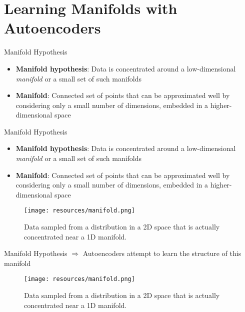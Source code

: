 \documentclass[handout]{beamer}
\begin{document}
\section{Learning Manifolds with Autoencoders}
\begin{frame}[t]{Manifold Hypothesis}
    \begin{itemize}
        \item \textbf{Manifold hypothesis}: Data is concentrated around a low-dimensional \textit{manifold} or a small set of such manifolds
            \pause
        \item \textbf{Manifold}: Connected set of points that can be approximated well by considering only a small number of dimensions, embedded in a higher-dimensional space
    \end{itemize}    
\end{frame}

\begin{frame}[t]{Manifold Hypothesis}
    \begin{itemize}
        \item \textbf{Manifold hypothesis}: Data is concentrated around a low-dimensional \textit{manifold} or a small set of such manifolds
        \item \textbf{Manifold}: Connected set of points that can be approximated well by considering only a small number of dimensions, embedded in a higher-dimensional space
    \end{itemize}    
            \begin{figure}[h]
                \centering
                \texttt{[image: resources/manifold.png]}
                \caption{Data sampled from a distribution in a 2D space that is actually concentrated near a 1D manifold.}
            \end{figure}
\end{frame}


\begin{frame}[t]{Manifold Hypothesis}
        $\Rightarrow$ Autoencoders attempt to learn the structure of this manifold \\
            \vspace{.5cm}
            \begin{figure}[h]
                \centering
                \texttt{[image: resources/manifold.png]}
                \caption{Data sampled from a distribution in a 2D space that is actually concentrated near a 1D manifold.}
            \end{figure}
\end{frame}
\end{document}

